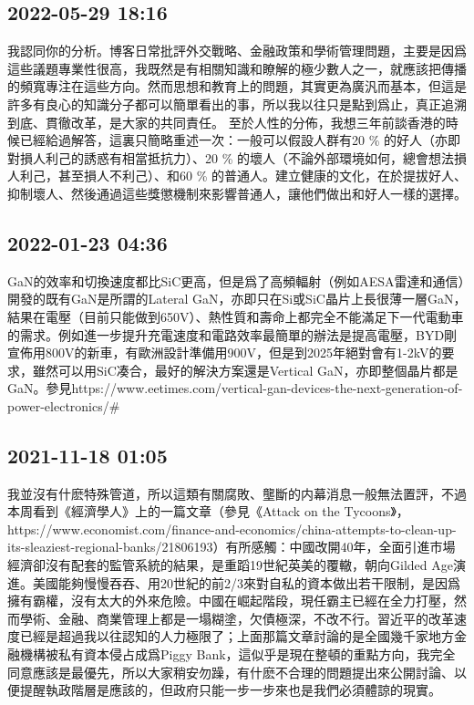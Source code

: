 \documentclass[twocolumn]{ctexart}
\begin{document}
\subsection*{2022-05-29 18:16}

我認同你的分析。博客日常批評外交戰略、金融政策和學術管理問題，主要是因爲這些議題專業性很高，我既然是有相關知識和瞭解的極少數人之一，就應該把傳播的頻寬專注在這些方向。然而思想和教育上的問題，其實更為廣汎而基本，但這是許多有良心的知識分子都可以簡單看出的事，所以我以往只是點到爲止，真正追溯到底、貫徹改革，是大家的共同責任。
至於人性的分佈，我想三年前談香港的時候已經給過解答，這裏只簡略重述一次：一般可以假設人群有20 \% 的好人（亦即對損人利己的誘惑有相當抵抗力）、20 \% 的壞人（不論外部環境如何，總會想法損人利己，甚至損人不利己）、和60 \% 的普通人。建立健康的文化，在於提拔好人、抑制壞人、然後通過這些獎懲機制來影響普通人，讓他們做出和好人一樣的選擇。
\subsection*{2022-01-23 04:36}

GaN的效率和切換速度都比SiC更高，但是爲了高頻輻射（例如AESA雷達和通信）開發的既有GaN是所謂的Lateral GaN，亦即只在Si或SiC晶片上長很薄一層GaN，結果在電壓（目前只能做到650V）、熱性質和壽命上都完全不能滿足下一代電動車的需求。例如進一步提升充電速度和電路效率最簡單的辦法是提高電壓，BYD剛宣佈用800V的新車，有歐洲設計準備用900V，但是到2025年絕對會有1-2kV的要求，雖然可以用SiC凑合，最好的解決方案還是Vertical GaN，亦即整個晶片都是GaN。參見https://www.eetimes.com/vertical-gan-devices-the-next-generation-of-power-electronics/\#
\subsection*{2021-11-18 01:05}

我並沒有什麽特殊管道，所以這類有關腐敗、壟斷的内幕消息一般無法置評，不過本周看到《經濟學人》上的一篇文章（參見《Attack on the Tycoons》，https://www.economist.com/finance-and-economics/china-attempts-to-clean-up-its-sleaziest-regional-banks/21806193）有所感觸：中國改開40年，全面引進市場經濟卻沒有配套的監管系統的結果，是重蹈19世紀英美的覆轍，朝向Gilded Age演進。美國能夠慢慢吞吞、用20世紀的前2/3來對自私的資本做出若干限制，是因爲擁有霸權，沒有太大的外來危險。中國在崛起階段，現任霸主已經在全力打壓，然而學術、金融、商業管理上都是一塌糊塗，欠債極深，不改不行。習近平的改革速度已經是超過我以往認知的人力極限了；上面那篇文章討論的是全國幾千家地方金融機構被私有資本侵占成爲Piggy Bank，這似乎是現在整頓的重點方向，我完全同意應該是最優先，所以大家稍安勿躁，有什麽不合理的問題提出來公開討論、以便提醒執政階層是應該的，但政府只能一步一步來也是我們必須體諒的現實。
\end{document}
